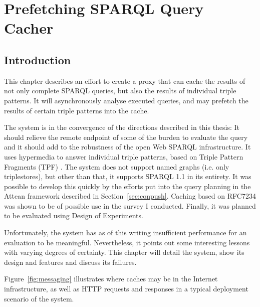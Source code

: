 
\chapter{Prefetching SPARQL Query Cacher}\label{sec:tpfcacheplanning}

\section{Introduction}

This chapter describes an effort to create a proxy that can cache the
results of not only complete SPARQL queries, but also the results of individual
triple patterns. It will asynchronously analyse executed queries, and
may prefetch the results of certain triple patterns into the cache.

The system is in the convergence of the directions described in this
thesis: It should relieve the remote endpoint of some of the
burden to evaluate the query and it should add to the robustness of
the open Web SPARQL infrastructure. It uses hypermedia to answer
individual triple patterns, based on Triple Pattern Fragments (TPF)
\cite{ldf1}. The system does not support named graphs (i.e. only
triplestores), but other than that, it supports SPARQL 1.1 in its
entirety. It was possible to develop this quickly by the efforts put
into the query planning in the Attean framework described in
Section~\ref{sec:conpush}. Caching based on RFC7234 \cite{rfc7234} was
shown to be of possible use in the survey I conducted. Finally, it was
planned to be evaluated using Design of Experiments.

Unfortunately, the system has as of this writing insufficient
performance for an evaluation to be meaningful. Nevertheless, it
points out some interesting lessons with varying degrees of
certainty. This chapter will detail the system, show its design and
features and discuss its failures.

Figure~\ref{fig:messaging} illustrates where caches may be in the
Internet infrastructure, as well as HTTP requests and responses in a
typical deployment scenario of the system.

